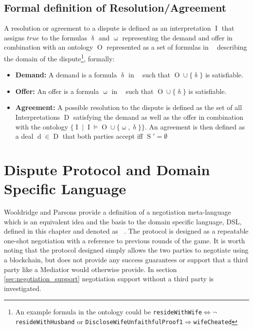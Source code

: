 \documentclass[12pt,msc,a4paper,oneside]{ucl_thesis}
\DeclareMathOperator{\Metalang}{\mathcal{L}_m}
\DeclareMathOperator{\Proplang}{\mathcal{L}(N)}
\DeclareMathOperator{\Interpretation}{I}
\DeclareMathOperator{\Ontology}{O}
\DeclareMathOperator{\Deal}{D}
\DeclareMathOperator{\deal}{d}
\DeclareMathOperator{\demand}{\delta}
\DeclareMathOperator{\offer}{\omega}
\DeclareMathOperator{\Statement}{S}
\begin{document}
\subsection{Formal definition of Resolution/Agreement} \label{sec:agreement}
A resolution or agreement to a dispute is defined as an interpretation $\Interpretation$ that assigns $true$ to the formulas $\demand$ and $\offer$ representing the demand and offer in combination with an ontology $\Ontology$ represented as a set of formulas in $\Proplang$ describing the domain of the dispute\footnote{An example formula in the ontology could be \texttt{resideWithWife$\Leftrightarrow\neg$resideWithHusband} or \texttt{DiscloseWifeUnfaithfulProof1$\Rightarrow$wifeCheated}}, formally\cite{Ragone2008}:
\begin{itemize}
    \item \textbf{Demand:} A demand is a formula $\demand$ in $\Proplang$ such that $\Ontology \cup \{\demand\}$ is satisfiable.
    \item \textbf{Offer:} An offer is a formula $\offer$ in $\Proplang$ such that $\Ontology \cup \{\demand\}$ is satisfiable.
    \item \textbf{Agreement:} A possible resolution to the dispute is defined as the set of all Interpretations $\Deal$ satisfying the demand as well as the offer in combination with the ontology $\{\Interpretation \mid \Interpretation \models \Ontology \cup \{\offer, \demand\}\}$. An agreement is then defined as a deal $\deal \in \Deal$ that both parties accept iff $\Statement' = \emptyset$
\end{itemize}


\section{Dispute Protocol and Domain Specific Language}
Wooldridge and Parsons \cite{Wooldridge:2000:LN:3006433.3006516} provide a definition of a negotiation meta-language which is an equivalent idea and the basis to the domain specific language, DSL, defined in this chapter and denoted as $\Metalang$. The protocol is designed as a repeatable one-shot negotiation with a reference to previous rounds of the game. It is worth noting that the protocol designed simply allows the two parties to negotiate using a blockchain, but does not provide any success guarantees or support that a third party like a Mediatior would otherwise provide. In section \ref{sec:negotiation_support} negotiation support without a third party is investigated.
\end{document}
